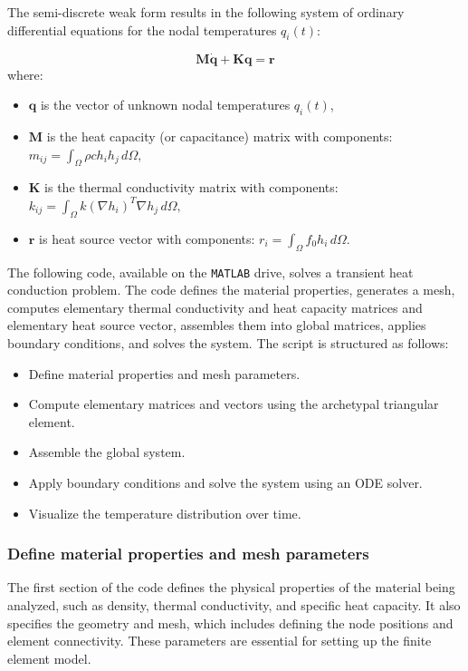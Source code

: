 \documentclass[12pt]{article}
\begin{document}
The semi-discrete weak form results in the following system of ordinary differential equations for the nodal temperatures \( q_i(t) \):

\[
    \mathbf{M} \mathbf{\dot{q}}+  \mathbf{K} \mathbf{q} = \mathbf{r}
\]
where:
\begin{itemize}
    \item \(\mathbf{q}\) is the vector of unknown nodal temperatures \( q_i(t)\),
    \item \(\mathbf{M}\) is the heat capacity (or capacitance) matrix with components:
          $
              m_{ij} = \int_{\Omega} \rho c h_i h_j \, d\Omega,
          $
    \item  \(\mathbf{K}\) is the thermal conductivity matrix with components:
          $
              k_{ij} = \int_{\Omega} k (\nabla h_i)^T \nabla h_j \, d\Omega,
          $
    \item  \(\mathbf{r}\) is heat source vector with components:
          $
              r_i = \int_{\Omega} f_0 h_i \, d\Omega.
          $
\end{itemize}
The following code, available on the \texttt{MATLAB} drive, solves a transient heat conduction problem. The code defines the material properties, generates a mesh, computes elementary thermal conductivity and heat capacity matrices and elementary heat source vector, assembles them into global matrices, applies boundary conditions, and solves the system. The script is structured as follows:
\begin{itemize}
    \item Define material properties and mesh parameters.
    \item Compute elementary matrices and vectors using the archetypal triangular element.
    \item Assemble the global system.
    \item Apply boundary conditions and solve the system using an ODE solver.
    \item Visualize the temperature distribution over time.
\end{itemize}

\subsubsection*{Define material properties and mesh parameters}
The first section of the code defines the physical properties of the material being analyzed, such as density, thermal conductivity, and specific heat capacity. It also specifies the geometry and mesh, which includes defining the node positions and element connectivity. These parameters are essential for setting up the finite element model.
\end{document}
